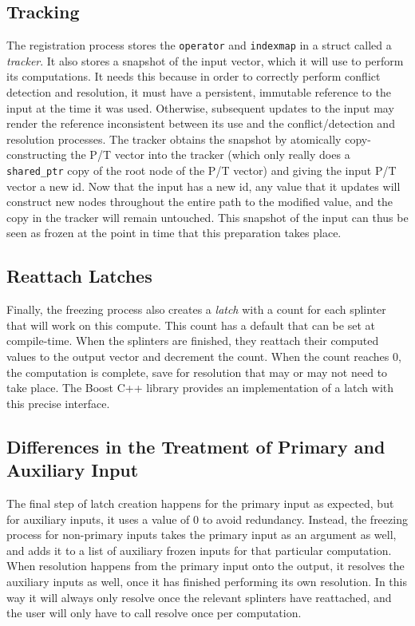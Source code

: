 \subsection{Tracking}
The registration process stores the \texttt{operator} and \texttt{indexmap} in a struct
called a \textit{tracker}. It also stores a snapshot of the input vector, which it
will use to perform its computations. It needs this because in order to
correctly perform conflict detection and resolution, it must have a persistent,
immutable reference to the input at the time it was used. Otherwise, subsequent
updates to the input may render the reference inconsistent between its use and
the conflict/detection and resolution processes. The tracker obtains the
snapshot by atomically copy-constructing the P/T vector into the tracker (which
only really does a \texttt{shared\_ptr} copy of the root node of the P/T vector)
and giving the input P/T vector a new id. Now that the input has a new id, any
value that it updates will construct new nodes throughout the entire path to the
modified value, and the copy in the tracker will remain untouched. This snapshot
of the input can thus be seen as frozen at the point in time that this
preparation takes place.

\subsection{Reattach Latches}
Finally, the freezing process also creates a \textit{latch} with a count for each
splinter that will work on this compute. This count has a default that can be
set at compile-time. When the splinters are finished, they reattach their
computed values to the output vector and decrement the count. When the count
reaches 0, the computation is complete, save for resolution that may or may not
need to take place. The Boost C++ library provides an implementation of a latch with 
this precise interface.

\subsection{Differences in the Treatment of Primary and Auxiliary Input}
The final step of latch creation happens for the primary input as expected, but for 
auxiliary inputs, it uses a value of 0 to avoid redundancy. 
Instead, the freezing process for non-primary inputs takes the primary input as an 
argument as well, and adds it to a list of auxiliary frozen inputs for that particular
computation. When resolution happens from the primary input onto the output, it resolves 
the auxiliary inputs as well, once it has finished performing its own resolution. In 
this way it will always only resolve once the relevant splinters have reattached, and 
the user will only have to call resolve once per computation.

